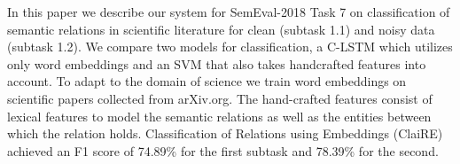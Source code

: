 In this paper we describe our system for SemEval-2018 Task 7 on classification of semantic relations in scientific literature for clean (subtask 1.1) and noisy data (subtask 1.2). We compare two models for classification, a C-LSTM which utilizes only word embeddings and an SVM that also takes handcrafted features into account. To adapt to the domain of science we train word embeddings on scientific papers collected from arXiv.org. The hand-crafted features consist of lexical features to model the semantic relations as well as the entities between which the relation holds. Classification of Relations using Embeddings (ClaiRE) achieved an F1 score of 74.89\% for the first subtask and 78.39\% for the second.
